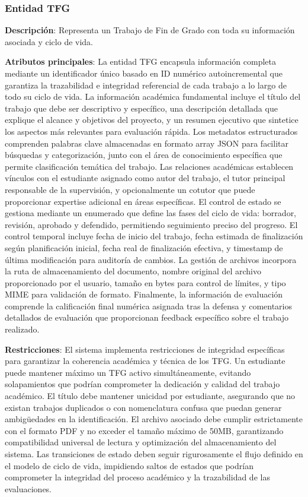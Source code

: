 \documentclass[12pt,a4paper,oneside]{report}
\begin{document}
\subsubsection{Entidad TFG}\label{entidad-tfg}

\textbf{Descripción}: Representa un Trabajo de Fin de Grado con toda su
información asociada y ciclo de vida.

\textbf{Atributos principales}: La entidad TFG encapsula información completa mediante un identificador único basado en ID numérico autoincremental que garantiza la trazabilidad e integridad referencial de cada trabajo a lo largo de todo su ciclo de vida. La información académica fundamental incluye el título del trabajo que debe ser descriptivo y específico, una descripción detallada que explique el alcance y objetivos del proyecto, y un resumen ejecutivo que sintetice los aspectos más relevantes para evaluación rápida. Los metadatos estructurados comprenden palabras clave almacenadas en formato array JSON para facilitar búsquedas y categorización, junto con el área de conocimiento específica que permite clasificación temática del trabajo. Las relaciones académicas establecen vínculos con el estudiante asignado como autor del trabajo, el tutor principal responsable de la supervisión, y opcionalmente un cotutor que puede proporcionar expertise adicional en áreas específicas. El control de estado se gestiona mediante un enumerado que define las fases del ciclo de vida: borrador, revisión, aprobado y defendido, permitiendo seguimiento preciso del progreso. El control temporal incluye fecha de inicio del trabajo, fecha estimada de finalización según planificación inicial, fecha real de finalización efectiva, y timestamp de última modificación para auditoría de cambios. La gestión de archivos incorpora la ruta de almacenamiento del documento, nombre original del archivo proporcionado por el usuario, tamaño en bytes para control de límites, y tipo MIME para validación de formato. Finalmente, la información de evaluación comprende la calificación final numérica asignada tras la defensa y comentarios detallados de evaluación que proporcionan feedback específico sobre el trabajo realizado.

\textbf{Restricciones}: El sistema implementa restricciones de integridad específicas para garantizar la coherencia académica y técnica de los TFG. Un estudiante puede mantener máximo un TFG activo simultáneamente, evitando solapamientos que podrían comprometer la dedicación y calidad del trabajo académico. El título debe mantener unicidad por estudiante, asegurando que no existan trabajos duplicados o con nomenclatura confusa que puedan generar ambigüedades en la identificación. El archivo asociado debe cumplir estrictamente con el formato PDF y no exceder el tamaño máximo de 50MB, garantizando compatibilidad universal de lectura y optimización del almacenamiento del sistema. Las transiciones de estado deben seguir rigurosamente el flujo definido en el modelo de ciclo de vida, impidiendo saltos de estados que podrían comprometer la integridad del proceso académico y la trazabilidad de las evaluaciones.
\end{document}
